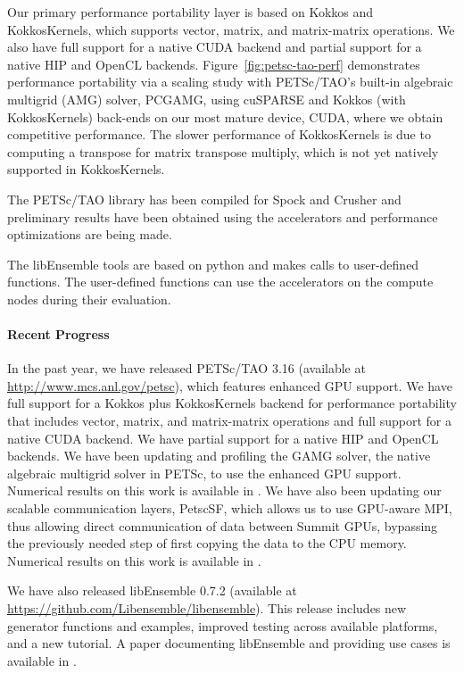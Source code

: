 Our primary performance portability layer is based on Kokkos and KokkosKernels, which supports 
vector, matrix, and matrix-matrix operations.  We also have full support for a native CUDA 
backend and partial support for a native HIP and OpenCL backends.  Figure~\ref{fig:petsc-tao-perf}
demonstrates performance portability via a scaling study with PETSc/TAO’s built-in algebraic multigrid 
(AMG) solver, PCGAMG, using cuSPARSE and Kokkos (with KokkosKernels) back-ends on our most 
mature device, CUDA, where we obtain competitive performance.  The slower performance of 
KokkosKernels is due to computing a transpose for matrix transpose multiply, which is 
not yet natively supported in KokkosKernels.

The PETSc/TAO library has been compiled for Spock and Crusher and preliminary results have
been obtained using the accelerators and performance optimizations are being made.

The libEnsemble tools are based on python and makes calls to user-defined functions.  
The user-defined functions can use the accelerators on the compute nodes during their
evaluation.

\paragraph{Recent Progress}

In the past year, we have released PETSc/TAO 3.16 (available at \url{http://www.mcs.anl.gov/petsc}), which 
features enhanced GPU support.  We have full support for a Kokkos plus KokkosKernels backend for 
performance portability that includes vector, matrix, and matrix-matrix operations and full 
support for a native CUDA backend.  We have partial support for a native HIP and OpenCL 
backends.  We have been updating and profiling the GAMG solver, the native algebraic 
multigrid solver in PETSc, to use the enhanced GPU support.  Numerical results on
this work is available in \cite{mills2021toward}.  We have also been updating
our scalable communication layers, PetscSF, which allows us to use GPU-aware
MPI, thus allowing direct communication of data between Summit GPUs, bypassing 
the previously needed step of first copying the data to the CPU memory.  Numerical
results on this work is available in \cite{zhang2021petscsf}.

We have also released libEnsemble 0.7.2 (available at \url{https://github.com/Libensemble/libensemble}).
This release includes new generator functions and examples, improved testing across available platforms,
and a new tutorial.  A paper documenting libEnsemble and providing use cases is available
in \cite{hudson2021libensemble}.

